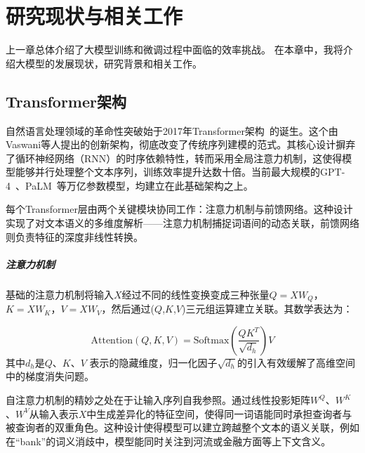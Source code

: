 
\chapter{研究现状与相关工作}

上一章总体介绍了大模型训练和微调过程中面临的效率挑战。
在本章中，我将介绍大模型的发展现状，研究背景和相关工作。


\section{Transformer架构}
自然语言处理领域的革命性突破始于2017年Transformer架构~\cite{Vaswani+2017}的诞生。这个由Vaswani等人提出的创新架构，彻底改变了传统序列建模的范式。其核心设计摒弃了循环神经网络（RNN）的时序依赖特性，转而采用全局注意力机制，这使得模型能够并行处理整个文本序列，训练效率提升达数十倍。当前最大规模的GPT-4~\cite{openai2023gpt4}、PaLM~\cite{chowdhery2023palm}等万亿参数模型，均建立在此基础架构之上。


每个Transformer层由两个关键模块协同工作：注意力机制与前馈网络。这种设计实现了对文本语义的多维度解析——注意力机制捕捉词语间的动态关联，前馈网络则负责特征的深度非线性转换。

\paragraph{注意力机制}
基础的注意力机制将输入$X$经过不同的线性变换变成三种张量$Q=XW_Q$，$K=XW_K$，$V=XW_V$，然后通过($Q$,$K$,$V$)三元组运算建立关联。其数学表达为：

\begin{equation}
    \text{Attention}(Q, K, V) = \text{Softmax}(\frac{QK^T}{\sqrt{d_h}})V
\end{equation}
其中$d_h$是$Q$、$K$、$V$ 表示的隐藏维度，归一化因子$\sqrt{d_h}$的引入有效缓解了高维空间中的梯度消失问题。

自注意力机制的精妙之处在于让输入序列自我参照。通过线性投影矩阵$W^Q$、$W^K$、$W^V$从输入表示$X$中生成差异化的特征空间，使得同一词语能同时承担查询者与被查询者的双重角色。这种设计使得模型可以建立跨越整个文本的语义关联，例如在“bank”的词义消歧中，模型能同时关注到河流或金融方面等上下文含义。

